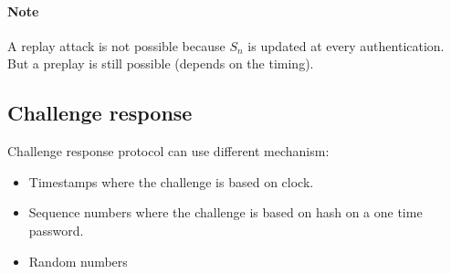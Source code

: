 \paragraph{Note} A replay attack is not possible because $S_n$ is
updated at every authentication. But a preplay is still possible (depends on the
timing).

\subsection{Challenge response}
Challenge response protocol can use different mechanism:
\begin{itemize}
    \item Timestamps where the challenge is based on clock.
    \item Sequence numbers where the challenge is based on hash on a
        one time password.
    \item Random numbers
\end{itemize}

